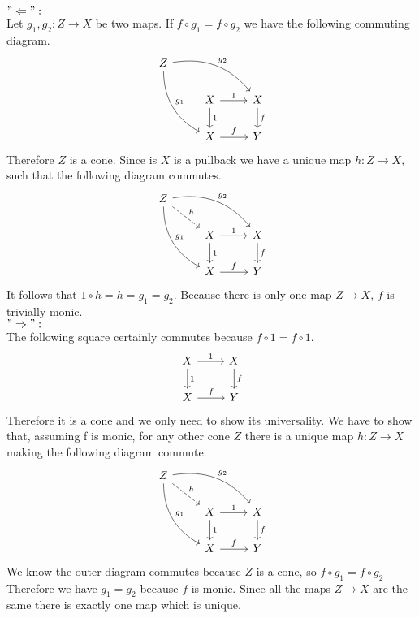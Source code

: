 \begin{answer}
  $"\Leftarrow":$ \\
  Let $g_1, g_2 : Z \to X$ be two maps. If $f \circ g_1 = f \circ g_2$
  we have the following commuting diagram.
  \[
    \begin{tikzcd}
      Z \arrow[bend right=30]{ddr}{g_1} \arrow[bend left=30]{drr}{g_2}&   &\\
             & X \arrow{r}{1}  \arrow{d}{1}  & X \arrow{d}{f}    \\
             & X \arrow{r}{f}                & Y
    \end{tikzcd}
  \]
  Therefore $Z$ is a cone. Since is $X$ is a pullback we have a unique map $h : Z \to X$,
  such that the following diagram commutes.
  \[
    \begin{tikzcd}
      Z \arrow[bend right=30]{ddr}{g_1} \arrow[bend left=30]{drr}{g_2} \arrow[dashed]{dr}{h}&   &\\
             & X \arrow{r}{1}  \arrow{d}{1}  & X \arrow{d}{f}    \\
             & X \arrow{r}{f}                & Y
    \end{tikzcd}
  \]
  It follows that $1 \circ h = h = g_1 = g_2$.
  Because there is only one map $Z \to X$, $f$ is trivially monic.\\
  $"\Rightarrow":$ \\
  The following square certainly commutes because $f \circ 1 = f \circ 1$.
  \[
    \begin{tikzcd}
      X \arrow{r}{1}  \arrow{d}{1}  & X \arrow{d}{f}    \\
      X \arrow{r}{f}                & Y
    \end{tikzcd}
  \]
  Therefore it is a cone and we only need to show its universality.
  We have to show that, assuming f is monic, for any other cone $Z$ there is a unique map
  $h : Z \to X$ making the following diagram commute.
  \[
    \begin{tikzcd}
      Z \arrow[bend right=30]{ddr}{g_1} \arrow[bend left=30]{drr}{g_2} \arrow[dashed]{dr}{h}&   &\\
             & X \arrow{r}{1}  \arrow{d}{1}  & X \arrow{d}{f}    \\
             & X \arrow{r}{f}                & Y
    \end{tikzcd}
  \]
  We know the outer diagram commutes because $Z$ is a cone, so $f \circ g_1 = f \circ g_2$
  Therefore we have $g_1 = g_2$ because $f$ is monic.
  Since all the maps $Z \to X$
  are the same there is exactly one map which is unique.
\end{answer}

